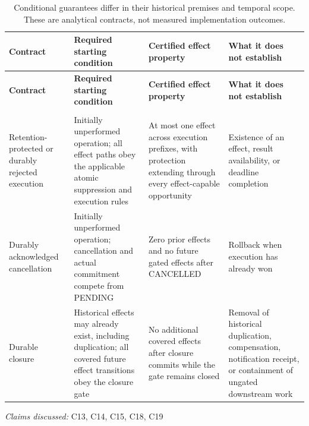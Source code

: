 \documentclass[11pt]{article}
\begin{document}
\begin{landscape}
\small
\begin{longtable}{@{}>{\raggedright\arraybackslash}p{}>{\raggedright\arraybackslash}p{}>{\raggedright\arraybackslash}p{}>{\raggedright\arraybackslash}p{}@{}}
\caption{Conditional guarantees differ in their historical premises and temporal scope. These are analytical contracts, not measured implementation outcomes.}\\
\toprule
\textbf{Contract} & \textbf{Required starting condition} & \textbf{Certified effect property} & \textbf{What it does not establish}\\
\midrule
\endfirsthead
\toprule
\textbf{Contract} & \textbf{Required starting condition} & \textbf{Certified effect property} & \textbf{What it does not establish}\\
\midrule
\endhead
\midrule
\multicolumn{4}{r}{\footnotesize Continued on next page}\\
\endfoot
\bottomrule
\endlastfoot
Retention-protected or durably rejected execution & Initially unperformed operation; all effect paths obey the applicable atomic suppression and execution rules & At most one effect across execution prefixes, with protection extending through every effect-capable opportunity & Existence of an effect, result availability, or deadline completion\\
Durably acknowledged cancellation & Initially unperformed operation; cancellation and actual commitment compete from PENDING & Zero prior effects and no future gated effects after CANCELLED & Rollback when execution has already won\\
Durable closure & Historical effects may already exist, including duplication; all covered future effect transitions obey the closure gate & No additional covered effects after closure commits while the gate remains closed & Removal of historical duplication, compensation, notification receipt, or containment of ungated downstream work\\
\end{longtable}
\par{}
\end{landscape}
\textit{Claims discussed: }C13, C14, C15, C18, C19
\end{document}
